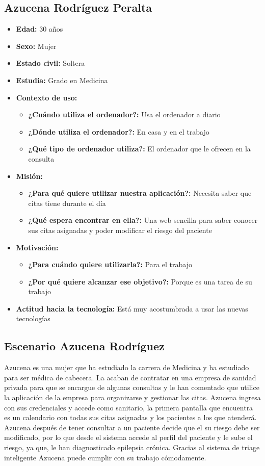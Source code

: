 \subsection{Azucena Rodríguez Peralta}
\begin{itemize}
    \item \textbf{Edad: } 30 años
    \item \textbf{Sexo: } Mujer
    \item \textbf{Estado civil: } Soltera
    \item \textbf{Estudia: } Grado en Medicina
    \item \textbf{Contexto de uso: } 
    \begin{itemize}
        \item \textbf{¿Cuándo utiliza el ordenador?: }  Usa el ordenador a diario
        \item \textbf{¿Dónde utiliza el ordenador?: } En casa y en el trabajo 
        \item \textbf{¿Qué tipo de ordenador utiliza?: } El ordenador que le ofrecen en la consulta
    \end{itemize}
    \item \textbf{Misión: } 
    \begin{itemize}
        \item \textbf{¿Para qué quiere utilizar nuestra aplicación?: } Necesita saber que citas tiene durante el día
        \item \textbf{¿Qué espera encontrar en ella?: } Una web sencilla para saber conocer sus citas asignadas y poder modificar el riesgo del paciente
    \end{itemize}
    \item \textbf{Motivación: } 
    \begin{itemize}
        \item \textbf{¿Para cuándo quiere utilizarla?: } Para el trabajo 
        \item \textbf{¿Por qué quiere alcanzar ese objetivo?: } Porque es una tarea de su trabajo
    \end{itemize}
    \item \textbf{Actitud hacia la tecnología: } Está muy acostumbrada a usar las nuevas tecnologías
\end{itemize}

\subsection{Escenario Azucena Rodríguez}
    Azucena es una mujer que ha estudiado la carrera de Medicina y ha estudiado para ser médica de cabecera. 
    La acaban de contratar en una empresa de sanidad privada para que se encargue de algunas consultas y le
    han comentado que utilice la aplicación de la empresa para organizarse y gestionar las citas. 
    Azucena ingresa con sus credenciales y accede como sanitario, la primera pantalla que encuentra 
    es un calendario con todas sus citas asignadas y los pacientes a los que atenderá.
    Azucena después de tener consultar a un paciente decide que el su riesgo debe ser modificado, por lo que 
    desde el sistema accede al perfil del paciente y le sube el riesgo, ya que, le han diagnosticado epilepsia
    crónica. Gracias al sistema de triage inteligente Azucena puede cumplir con su trabajo cómodamente.